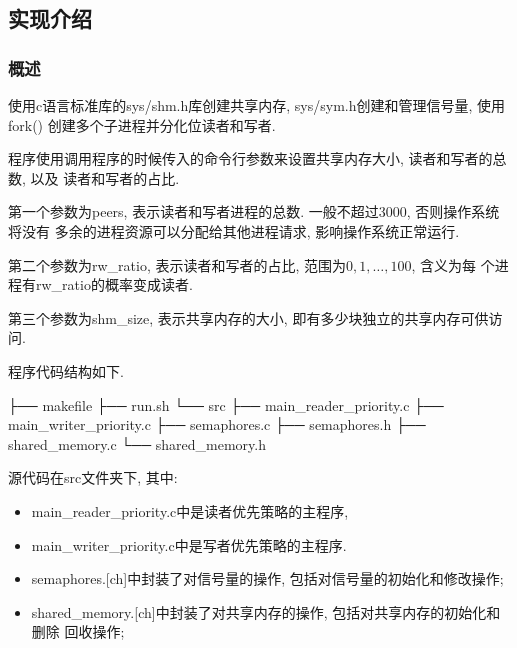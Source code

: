 \subsection{实现介绍}
\subsubsection{概述}
使用c语言标准库的sys/shm.h库创建共享内存, sys/sym.h创建和管理信号量, 使用fork()
创建多个子进程并分化位读者和写者.\par

程序使用调用程序的时候传入的命令行参数来设置共享内存大小, 读者和写者的总数, 以及
读者和写者的占比. \par

第一个参数为peers, 表示读者和写者进程的总数. 一般不超过3000, 否则操作系统将没有
多余的进程资源可以分配给其他进程请求, 影响操作系统正常运行.\par

第二个参数为rw\_ratio, 表示读者和写者的占比, 范围为$0, 1, \dots, 100$, 含义为每
个进程有rw\_ratio的概率变成读者.\par

第三个参数为shm\_size, 表示共享内存的大小, 即有多少块独立的共享内存可供访问.\par

程序代码结构如下.

\begin{code}
    ├── makefile
    ├── run.sh
    └── src
    ├── main_reader_priority.c
    ├── main_writer_priority.c
    ├── semaphores.c
    ├── semaphores.h
    ├── shared_memory.c
    └── shared_memory.h
\end{code}

源代码在src文件夹下, 其中:
\begin{itemize}
    \item main\_reader\_priority.c中是读者优先策略的主程序,
    \item main\_writer\_priority.c中是写者优先策略的主程序.
    \item semaphores.[ch]中封装了对信号量的操作, 包括对信号量的初始化和修改操作;
    \item shared\_memory.[ch]中封装了对共享内存的操作, 包括对共享内存的初始化和删除
          回收操作;
\end{itemize}

